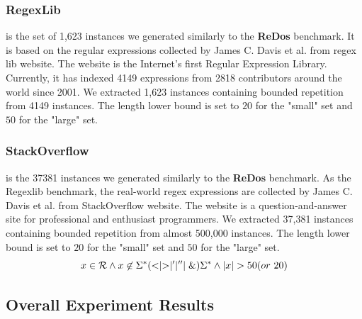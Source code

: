 {  \subsubsection{RegexLib} is the set of 1,623 instances we generated similarly to the \textbf{ReDos} benchmark. It is based on the regular expressions collected by James C. Davis et al.\cite{regex_lingua_franca} from regex lib website\cite{regexlib}. The website is the Internet's first Regular Expression Library. Currently, it has indexed 4149 expressions from 2818 contributors around the world since 2001. We extracted 1,623 instances containing bounded repetition from 4149 instances. The length lower bound is set to $20$ for the "small" set and $50$ for the "large" set.

  \subsubsection{StackOverflow} is the 37381 instances we generated similarly to the \textbf{ReDos} benchmark. As the Regexlib benchmark, the real-world regex expressions are collected by James C. Davis et al.\cite{regex_lingua_franca} from StackOverflow website\cite{stackoverflow}. The website is a question-and-answer site for professional and enthusiast programmers. We extracted 37,381 instances containing bounded repetition from almost 500,000 instances. The length lower bound is set to $20$ for the "small" set and $50$ for the "large" set.
  \begin{equation} \label{eq:template}
    x\in \mathcal{R} \wedge x\not\in \Sigma^*(<\mid >\mid '\mid ''\mid \&)\Sigma^*\wedge |x| > 50(or \ 20)
  \end{equation}
}

\vspace{-3mm}
\subsection{Overall Experiment Results}
\vspace{-2mm}

